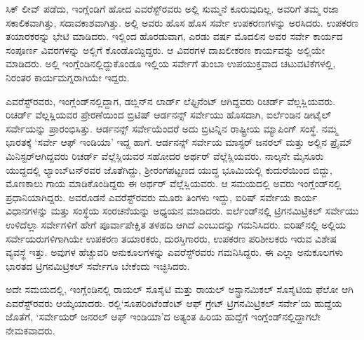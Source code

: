 ಸಿಕ್​ ಲೀವ್​ ಪಡೆದು, ಇಂಗ್ಲೆಂಡಿಗೆ ಹೋದ ಎವರೆಸ್ಟ್​ರವರು ಅಲ್ಲಿ ಸುಮ್ಮನೆ ಕೂರುವುದಿಲ್ಲ. ಅವರಿಗೆ ತಮ್ಮ ರಜಾ ಸಕಾಲಿಕವಾಗಿತ್ತು, ಸದಾವಕಾಶವಾಗಿತ್ತು. ಅಲ್ಲಿ ಅವರು ಹೊಸ ಹೊಸ ಸರ್ವೇ ಉಪಕರಣಗಳನ್ನು ಅರಸಿದರು. ಉಪಕರಣ ತಯಾರಕರನ್ನು ಭೇಟಿ ಮಾಡಿದರು. ಇಲ್ಲಿಂದ ಹೊರಡುವಾಗ, ಎರಡು ವರ್ಷ ಮೊದಲಿನ ಅವರ ಸರ್ವೇ ಕಾರ್ಯದ ಸಂಪೂರ್ಣ ವಿವರಗಳನ್ನು ಅಲ್ಲಿಗೆ ಕೊಂಡೊಯ್ದಿದ್ದರು. ಆ ವಿವರಗಳ ದಾಖಲೀಕರಣ ಕಾರ್ಯವನ್ನು ಅಲ್ಲಿಯೇ ಮಾಡಿದರು. ಅಲ್ಲಿ ಇಂಗ್ಲೆಂಡಿನಲ್ಲಿದ್ದುಕೊಂಡೂ ಇಲ್ಲಿಯ ಸರ್ವೇಗೆ ತುಂಬಾ ಉಪಯುಕ್ತವಾದ ಚಟುವಟಿಕೆಗಳಲ್ಲಿ, ನಿರಂತರ ಕಾರ್ಯಮಗ್ನರಾಗಿಯೇ ಇದ್ದರು.

ಎವರೆಸ್ಟ್​ರವರು, ಇಂಗ್ಲೆಂಡ್​ನಲ್ಲಿದ್ದಾಗ, ಡಬ್ಲಿನ್​ನ ಲಾರ್ಡ್ ಲೆಫ್ಟಿನೆಂಟ್​ ಆಗಿದ್ದವರು ರಿಚರ್ಡ್ ವೆಲ್ಲಸ್ಲಿಯವರು. ರಿಚರ್ಡ್ ವೆಲ್ಲಸ್ಲಿಯವರ ಪ್ರೇರಣೆಯಿಂದ ಬ್ರಿಟಿಷ್​ ಆರ್ಡನನ್ಸ್​ ಸರ್ವೇಯು ಹೊಸದಾಗಿ, ಐರ್ಲೆಂಡಿನ ಡೀಟೈಲ್​ ಸರ್ವೇಯನ್ನು ಪ್ರಾರಂಭಿಸಿತ್ತು. ಆರ್ಡನನ್ಸ್​ ಸರ್ವೇಯೆಂದರೆ ಅದು ಬ್ರಿಟನ್ನಿನ ರಾಷ್ಟ್ರೀಯ ಮ್ಯಾಪಿಂಗ್​ ಸಂಸ್ಥೆ. ನಮ್ಮ ಭಾರತಕ್ಕೆ ‘ಸರ್ವೇ ಆಫ್​ ಇಂಡಿಯಾ’ ಇದ್ದ ಹಾಗೆ. ಆರ್ಡನನ್ಸ್​ ಸರ್ವೇಯ ಮಾಸ್ಟರ್​ ಜನರಲ್​ ಮತ್ತು ಅಲ್ಲಿನ ಪ್ರೈಮ್ ಮಿನಿಸ್ಟರ್​ ಆಗಿದ್ದವರು ರಿಚರ್ಡ್ ವೆಲ್ಲೆಸ್ಲಿಯವರ ಸಹೋದರ ಅರ್ಥರ್​ ವೆಲ್ಲೆಸ್ಲಿಯವರು. ನಾಲ್ಕನೇ ಮೈಸೂರು ಯುದ್ದದಲ್ಲಿ ಲ್ಯಾಂಬ್​ಟನ್​ರವರ ಜೊತೆಗಿದ್ದು, ಶ‍್ರೀರಂಗಪಟ್ಟಣದ ಯುದ್ಧ ಭೂಮಿಯಲ್ಲಿ ಕುದುರೆಯಿಂದ ಬಿದ್ದು, ಮೊಣಕಾಲು ಗಾಯ ಮಾಡಿಕೊಂಡಿದ್ದರು ಈ ಅರ್ಥರ್​ ವೆಲ್ಲೆಸ್ಲಿಯವರು. ಆ ಸಮಯದಲ್ಲಿ ಅವರು ಇಂಗ್ಲೆಂಡ್​ನಲ್ಲಿ ಪ್ರಧಾನಿಯಾಗಿದ್ದರು. ಅವರೊಡನೆ ಎವರೆಸ್ಟ್​ರವರು ಮೂರು ತಿಂಗಳು ಇದ್ದು, ಐರಿಷ್​ ಸರ್ವೇಯ ಕಾರ್ಯ ವಿಧಾನಗಳನ್ನು ಮತ್ತು ಸಂಸ್ಥೆಯ ಸಂರಚನೆಯನ್ನು ಅಧ್ಯಯನ ಮಾಡಿದರು. ಐರ್ಲೆಂಡ್​ನಲ್ಲಿ ಟ್ರಿಗನಮಿಟ್ರಿಕಲ್​ ಸರ್ವೇಯು ಉಳಿದೆಲ್ಲಾ ಸರ್ವೇಗಳಿಗೆ ಹೇಗೆ ಪೂರ್ವಾಪೇಕ್ಷಿತ ತಳಹದಿ ಆಗಿದೆ ಎಂಬುದನ್ನು ಗಮನಿಸಿದರು. ಐರಿಷ್​ನಲ್ಲಿ ಅಲ್ಲಿಯ ಸರ್ವೇಯರುಗಳಿಗಾಗಿಯೇ ಉಪಕರಣ ತಯಾರಕರು, ದುರಸ್ತಿಗಾರರು, ಉಪಕರಣ ಪರಿಶೀಲಕರು ಇರುವ ವಿಶೇಷ ವ್ಯವಸ್ಥೆ ಇತ್ತು. ಅವುಗಳ ಹೆಚ್ಚುವರಿ ಅನುಕೂಲಗಳನ್ನು ಎವರೆಸ್ಟ್​ರವರು ಗಮನಿಸಿದ್ದರು. ಈ ಎಲ್ಲಾ ಅನುಕೂಲಗಳು ಭಾರತದ ಟ್ರಿಗನಮಿಟ್ರಿಕಲ್​ ಸರ್ವೇಗೂ ಬೇಕೆಂದು ಇಚ್ಛಿಸಿದರು.

ಅದೇ ಸಮಯದಲ್ಲಿ, ಇಂಗ್ಲೆಂಡಿನಲ್ಲಿ ರಾಯಲ್​ ಸೊಸೈಟಿ ಮತ್ತು ರಾಯಲ್​ ಅಸ್ಟ್ರಾನಮಿಕಲ್​ ಸೊಸೈಟಿಯ ಫೆಲೋ ಆಗಿ ಎವರೆಸ್ಟ್​ರವರು ಆಯ್ಕೆಯಾದರು. ರಲ್ಲಿ\break ‘ಸೂಪರಿಂಟೆಂಡೆಂಟ್​ ಆಫ್​ ಗ್ರೇಟ್​ ಟ್ರಿಗನಮಿಟ್ರಿಕಲ್​ ಸರ್ವೇ’ಯ ಹುದ್ದೆಯ ಜೊತೆಗೆ, ‘ಸರ್ವೇಯರ್​ ಜನರಲ್​ ಆಫ್​ ಇಂಡಿಯಾ’ದ ಅತ್ಯಂತ ಹಿರಿಯ ಹುದ್ದೆಗೆ ಇಂಗ್ಲೆಂಡ್​ನಲ್ಲಿ\break ದ್ದಾಗಲೇ ನೇಮಕವಾದರು.

